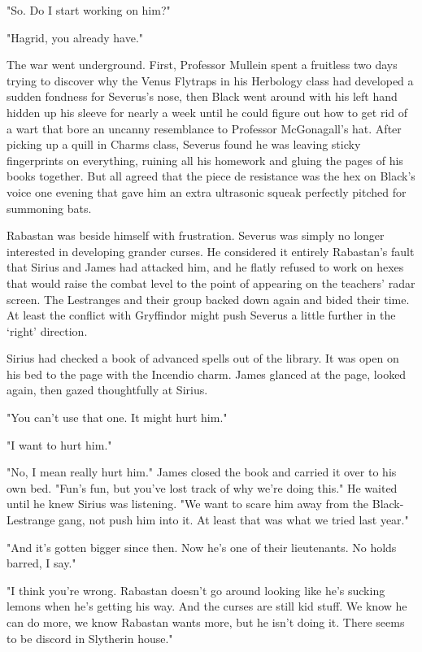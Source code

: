 \documentclass[a4paper,11pt]{article}
\begin{document}
"So. Do I start working on him?"

"Hagrid, you already have."

The war went underground. First, Professor Mullein spent a fruitless two days trying to discover why the Venus Flytraps in his Herbology class had developed a sudden fondness for Severus's nose, then Black went around with his left hand hidden up his sleeve for nearly a week until he could figure out how to get rid of a wart that bore an uncanny resemblance to Professor McGonagall's hat. After picking up a quill in Charms class, Severus found he was leaving sticky fingerprints on everything, ruining all his homework and gluing the pages of his books together. But all agreed that the piece de resistance was the hex on Black's voice one evening that gave him an extra ultrasonic squeak perfectly pitched for summoning bats.

Rabastan was beside himself with frustration. Severus was simply no longer interested in developing grander curses. He considered it entirely Rabastan's fault that Sirius and James had attacked him, and he flatly refused to work on hexes that would raise the combat level to the point of appearing on the teachers' radar screen. The Lestranges and their group backed down again and bided their time. At least the conflict with Gryffindor might push Severus a little further in the `right' direction.

Sirius had checked a book of advanced spells out of the library. It was open on his bed to the page with the Incendio charm. James glanced at the page, looked again, then gazed thoughtfully at Sirius.

"You can't use that one. It might hurt him."

"I want to hurt him."

"No, I mean really hurt him." James closed the book and carried it over to his own bed. "Fun's fun, but you've lost track of why we're doing this." He waited until he knew Sirius was listening. "We want to scare him away from the Black-Lestrange gang, not push him into it. At least that was what we tried last year."

"And it's gotten bigger since then. Now he's one of their lieutenants. No holds barred, I say."

"I think you're wrong. Rabastan doesn't go around looking like he's sucking lemons when he's getting his way. And the curses are still kid stuff. We know he can do more, we know Rabastan wants more, but he isn't doing it. There seems to be discord in Slytherin house."
\end{document}
